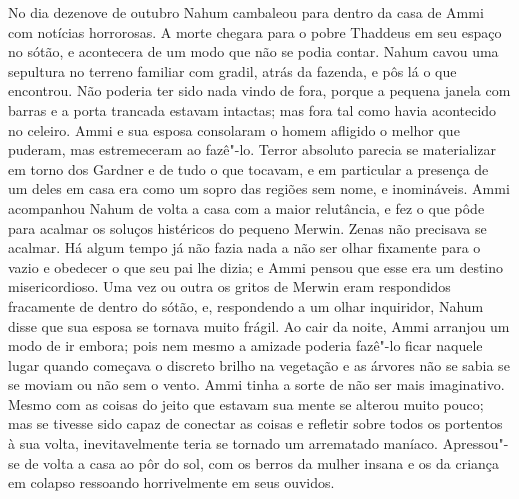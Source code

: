 No dia dezenove de outubro Nahum cambaleou para dentro da casa de Ammi
com notícias horrorosas. A morte chegara para o pobre Thaddeus em seu
espaço no sótão, e acontecera de um modo que não se podia contar. Nahum
cavou uma sepultura no terreno familiar com gradil, atrás da fazenda, e
pôs lá o que encontrou. Não poderia ter sido nada vindo de fora, porque
a pequena janela com barras e a porta trancada estavam intactas; mas
fora tal como havia acontecido no celeiro. Ammi e sua esposa consolaram
o homem afligido o melhor que puderam, mas estremeceram ao fazê"-lo.
Terror absoluto parecia se materializar em torno dos Gardner e de tudo o
que tocavam, e em particular a presença de um deles em casa era como um
sopro das regiões sem nome, e inomináveis. Ammi acompanhou Nahum de
volta a casa com a maior relutância, e fez o que pôde para acalmar os
soluços histéricos do pequeno Merwin. Zenas não precisava se acalmar. Há
algum tempo já não fazia nada a não ser olhar fixamente para o vazio e
obedecer o que seu pai lhe dizia; e Ammi pensou que esse era um destino
misericordioso. Uma vez ou outra os gritos de Merwin eram respondidos
fracamente de dentro do sótão, e, respondendo a um olhar inquiridor,
Nahum disse que sua esposa se tornava muito frágil. Ao cair da noite,
Ammi arranjou um modo de ir embora; pois nem mesmo a amizade poderia
fazê"-lo ficar naquele lugar quando começava o discreto brilho na
vegetação e as árvores não se sabia se se moviam ou não sem o vento.
Ammi tinha a sorte de não ser mais imaginativo. Mesmo com as coisas do
jeito que estavam sua mente se alterou muito pouco; mas se tivesse sido
capaz de conectar as coisas e refletir sobre todos os portentos à sua
volta, inevitavelmente teria se tornado um arrematado maníaco.
Apressou"-se de volta a casa ao pôr do sol, com os berros da mulher
insana e os da criança em colapso ressoando horrivelmente em seus
ouvidos.


